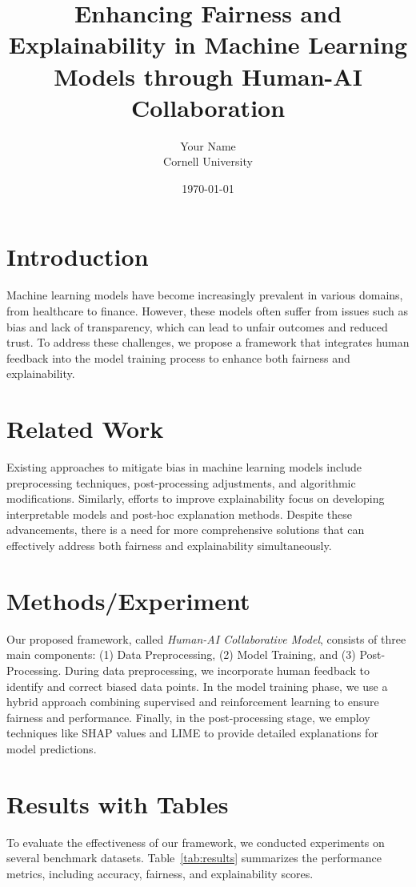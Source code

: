 \documentclass{article}
\title{Enhancing Fairness and Explainability in Machine Learning Models through Human-AI Collaboration}
\author{Your Name \\ Cornell University}
\date{\today}
\begin{document}
\maketitle

\section{Introduction}
Machine learning models have become increasingly prevalent in various domains, from healthcare to finance. However, these models often suffer from issues such as bias and lack of transparency, which can lead to unfair outcomes and reduced trust. To address these challenges, we propose a framework that integrates human feedback into the model training process to enhance both fairness and explainability.

\section{Related Work}
Existing approaches to mitigate bias in machine learning models include preprocessing techniques, post-processing adjustments, and algorithmic modifications. Similarly, efforts to improve explainability focus on developing interpretable models and post-hoc explanation methods. Despite these advancements, there is a need for more comprehensive solutions that can effectively address both fairness and explainability simultaneously.

\section{Methods/Experiment}
Our proposed framework, called \textit{Human-AI Collaborative Model}, consists of three main components: (1) Data Preprocessing, (2) Model Training, and (3) Post-Processing. During data preprocessing, we incorporate human feedback to identify and correct biased data points. In the model training phase, we use a hybrid approach combining supervised and reinforcement learning to ensure fairness and performance. Finally, in the post-processing stage, we employ techniques like SHAP values and LIME to provide detailed explanations for model predictions.

\section{Results with Tables}
To evaluate the effectiveness of our framework, we conducted experiments on several benchmark datasets. Table~\ref{tab:results} summarizes the performance metrics, including accuracy, fairness, and explainability scores.
\end{document}
